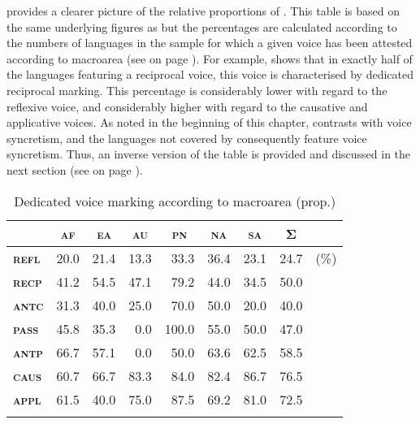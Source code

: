  provides a clearer picture of the relative proportions of . This table is based on the same underlying figures as  but the percentages are calculated according to the numbers of languages in the sample for which a given voice has been attested according to macroarea (see  on page \pageref{tab:ch6:voice-frequency}). For example,  shows that in exactly half of the languages featuring a reciprocal voice, this voice is characterised by dedicated reciprocal marking. This percentage is considerably lower with regard to the reflexive voice, and considerably higher with regard to the causative and applicative voices. As noted in the beginning of this chapter,  contrasts with voice syncretism, and the languages not covered by  consequently feature voice syncretism. Thus, an inverse version of the table is provided and discussed in the next section (see  on page \pageref{tab:ch6:voice-syncretism-macroarea-2}). 

\begin{table}
	\setlength{\tabcolsep}{3pt}
	\begin{tabularx}{.64\textwidth}{lrrrrrrrl}
		\lsptoprule
		& \multicolumn{1}{c}{\textbf{\textsc{af}}} & \multicolumn{1}{c}{\textbf{\textsc{ea}}} & \multicolumn{1}{c}{\textbf{\textsc{au}}} & \multicolumn{1}{c}{\textbf{\textsc{pn}}} & \multicolumn{1}{c}{\textbf{\textsc{na}}} & \multicolumn{1}{c}{\textbf{\textsc{sa}}} & \multicolumn{1}{c}{\textbf{Σ}} & \\
		\midrule
		\textbf{\textsc{refl}} & 20.0 & 21.4 & 13.3 & 33.3 & 36.4 & 23.1 & 24.7 & (\%) \\
		\textbf{\textsc{recp}} & 41.2 & 54.5 & 47.1 & 79.2 & 44.0 & 34.5 & 50.0 & \\
		\textbf{\textsc{antc}} & 31.3 & 40.0 & 25.0 & 70.0 & 50.0 & 20.0 & 40.0 & \\
		\textbf{\textsc{pass}} & 45.8 & 35.3 & 0.0 & 100.0 & 55.0 & 50.0 & 47.0 & \\
		\textbf{\textsc{antp}} & 66.7 & 57.1 & 0.0 & 50.0 & 63.6 & 62.5 & 58.5 & \\
		\textbf{\textsc{caus}} & 60.7 & 66.7 & 83.3 & 84.0 & 82.4 & 86.7 & 76.5 & \\
		\textbf{\textsc{appl}} & 61.5 & 40.0 & 75.0 & 87.5 & 69.2 & 81.0 & 72.5 & \\
		\lspbottomrule
	\end{tabularx}
	\caption{Dedicated voice marking according to macroarea (prop.)}
	\label{tab:ch6:voice-dedicated-2}
\end{table}

